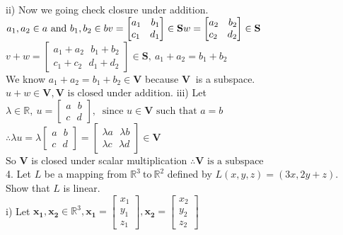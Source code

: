 \documentclass[10pt,a4paper]{article}
\numberwithin{equation}{section}
\begin{document}
ii) Now we going check closure under addition. $a_{1},a_{2} \in a \text{ and } b_{1},b_{2} \in b \\ v=\begin{bmatrix}
		a_{1} ~~~ b_{1} \\
		c_{1} ~~~ d_{1}
	\end{bmatrix} \in \mathbf{S} \\ w=\begin{bmatrix}
	a_{2} ~~~ b_{2} \\
	c_{2} ~~~ d_{2}
\end{bmatrix} \in \mathbf{S}$ \\
$v+w=\begin{bmatrix}
	a_{1}+a_{2} ~~~ b_{1}+b_{2} \\
	c_{1}+c_{2} ~~~ d_{1}+d_{2}
\end{bmatrix} \in \mathbf{S},~a_{1}+a_{2}=b_{1}+b_{2}$ \\
We know $a_{1}+a_{2}=b_{1}+b_{2} \in \mathbf{V}$ because $\mathbf{V}~$ is a subspace. \\
$u+w \in \mathbf{V},\mathbf{V}\text{ is closed under addition.}$
iii) Let $\lambda \in \mathbb{R}, ~ u=\begin{bmatrix}
		a ~~~ b \\
		c ~~~ d
	\end{bmatrix},~ \text{ since } u \in \mathbf{V} \text{ such that } a=b$ \\
$\therefore \lambda u =\lambda \begin{bmatrix}
		a ~~~ b \\
		c ~~~ d
	\end{bmatrix} = \begin{bmatrix}
	\lambda a ~~~ \lambda b \\
	\lambda c ~~~ \lambda d
\end{bmatrix} \in \mathbf{V}$ \\
$\text{So } \mathbf{V}$ is closed under scalar multiplication $\therefore \mathbf{V} \text{ is a subspace}$
~\\
4. Let $L$ be a mapping from $\mathbb{R}^3~ \text{to}~ \mathbb{R}^2$ defined by $L(x,y,z)=(3x,2y+z)$. Show that $L$ is linear. \\
i) Let $\mathbf{x_1,x_2} \in \mathbb{R}^3 ,\mathbf{x_1} =\begin{bmatrix}
		x_{1} \\
		y_{1} \\
		z_{1}
	\end{bmatrix},\mathbf{x_2} =\begin{bmatrix}
	x_{2} \\
	y_{2} \\
	z_{2}
\end{bmatrix}$ \\
\end{document}

